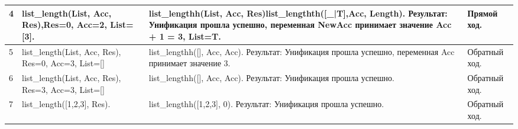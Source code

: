 \begin{table}[!ht]
\begin{center}
\begin{threeparttable}
\begin{tabular}{|m{0.5cm}|m{3.5cm}|m{8.5cm}|m{3cm}|}
				4                                                                          & list\_length(List, Acc, Res),\newline Res=0, \newline Acc=2, \newline List=[3].
				                                                                           & list\_lengthh(List, Acc, Res)list\_lengthth([\_|T],Acc, Length). Результат:
				Унификация прошла успешно, переменная NewAcc принимает значение Acc + 1 = 3,
				List=T.                                                                    & Прямой ход.                                                                                                           \\
				\hline
				5                                                                          & list\_length(List, Acc, Res), \newline Res=0, \newline Acc=3, \newline List=[]
				                                                                           & list\_lengthh([], Acc, Acc). Результат: Унификация прошла успешно, переменная
				Acc принимает значение 3.                                                  & Обратный ход.                                                                                                         \\
				\hline
				6                                                                          & list\_length(List, Acc, Res), \newline Res=3, \newline Acc=3, \newline List=[]
				                                                                           & list\_lengthh([], Acc, Acc). Результат: Унификация прошла успешно.            & Обратный
				ход.                                                                                                                                                                                               \\
				\hline
				7                                                                          & list\_length([1,2,3], Res).                                                   & list\_lengthh([1,2,3], 0). Результат:
				Унификация прошла успешно.                                                 & Обратный ход.                                                                                                         \\
				\hline
			\end{tabular}
		\end{threeparttable}
	\end{center}
\end{table}